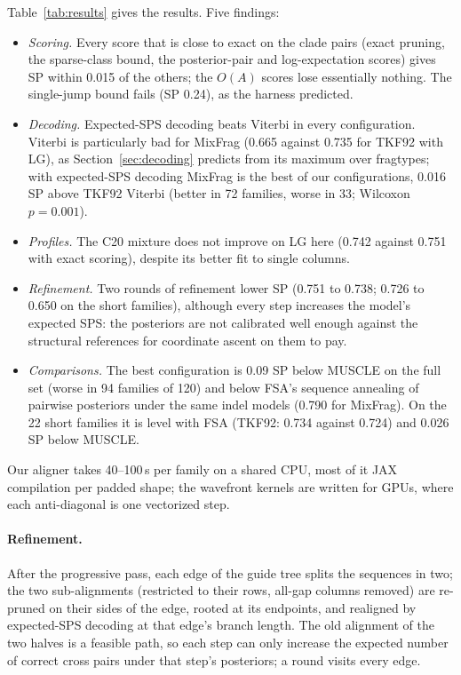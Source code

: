 \documentclass[11pt]{article}
\begin{document}
Table~\ref{tab:results} gives the results. Five findings:
\begin{itemize}
\item \emph{Scoring.} Every score that is close to exact on the clade pairs
  (exact pruning, the sparse-class bound, the posterior-pair and
  log-expectation scores) gives SP within 0.015 of the others; the $O(A)$
  scores lose essentially nothing. The single-jump bound fails (SP 0.24), as
  the harness predicted.
\item \emph{Decoding.} Expected-SPS decoding beats Viterbi in every
  configuration. Viterbi is particularly bad for MixFrag (0.665 against 0.735
  for TKF92 with LG), as Section~\ref{sec:decoding} predicts from its maximum
  over fragtypes; with expected-SPS decoding MixFrag is the best of our
  configurations, 0.016 SP above TKF92 Viterbi (better in 72 families, worse
  in 33; Wilcoxon $p=0.001$).
\item \emph{Profiles.} The C20 mixture does not improve on LG here (0.742
  against 0.751 with exact scoring), despite its better fit to single columns.
\item \emph{Refinement.} Two rounds of refinement lower SP (0.751 to 0.738;
  0.726 to 0.650 on the short families), although every step increases the
  model's expected SPS: the posteriors are not calibrated well enough against
  the structural references for coordinate ascent on them to pay.
\item \emph{Comparisons.} The best configuration is 0.09 SP below MUSCLE on the
  full set (worse in 94 families of 120) and below FSA's sequence annealing of
  pairwise posteriors under the same indel models (0.790 for MixFrag). On the
  22 short families it is level with FSA (TKF92: 0.734 against 0.724) and
  0.026 SP below MUSCLE.
\end{itemize}
Our aligner takes 40--100\,s per family on a shared CPU, most of it JAX
compilation per padded shape; the wavefront kernels are written for GPUs,
where each anti-diagonal is one vectorized step.

\paragraph{Refinement.}
\label{sec:refine}
After the progressive pass, each edge of the guide tree splits the sequences in
two; the two sub-alignments (restricted to their rows, all-gap columns removed)
are re-pruned on their sides of the edge, rooted at its endpoints, and realigned
by expected-SPS decoding at that edge's branch length. The old alignment of the
two halves is a feasible path, so each step can only increase the expected
number of correct cross pairs under that step's posteriors; a round visits every
edge.
\end{document}
